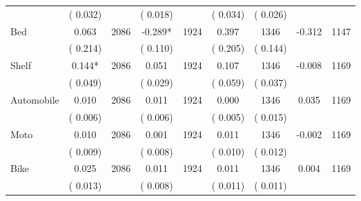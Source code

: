 \begin{tabular}{l*{8}{c}}
                       &       (       0.032)            &                               &       (       0.018)            &                               &       (       0.034)            &       (       0.026) &                  \\
Bed        &              0.063      &       2086       &             -0.289*      &       1924       &              0.397      &       1346  &       -0.312 &       1147       \\
                       &       (       0.214)            &                               &       (       0.110)            &                               &       (       0.205)            &       (       0.144) &                  \\
Shelf        &              0.144*      &       2086       &              0.051      &       1924       &              0.107      &       1346  &       -0.008 &       1169       \\
                       &       (       0.049)            &                               &       (       0.029)            &                               &       (       0.059)            &       (       0.037) &                  \\
Automobile        &              0.010      &       2086       &              0.011      &       1924       &              0.000      &       1346  &        0.035 &       1169       \\
                       &       (       0.006)            &                               &       (       0.006)            &                               &       (       0.005)            &       (       0.015) &                  \\
Moto        &              0.010      &       2086       &              0.001      &       1924       &              0.011      &       1346  &       -0.002 &       1169       \\
                       &       (       0.009)            &                               &       (       0.008)            &                               &       (       0.010)            &       (       0.012) &                  \\
Bike        &              0.025      &       2086       &              0.011      &       1924       &              0.011      &       1346  &        0.004 &       1169       \\
                       &       (       0.013)            &                               &       (       0.008)            &                               &       (       0.011)            &       (       0.011) &                  \\

\end{tabular}
